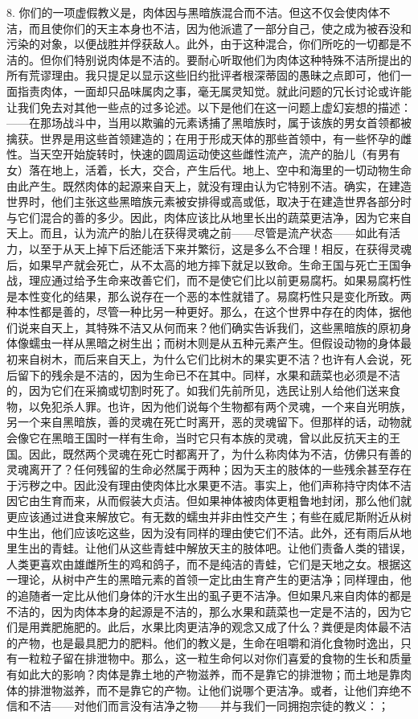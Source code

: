 8. 你们的一项虚假教义是，肉体因与黑暗族混合而不洁。但这不仅会使肉体不洁，而且使你们的天主本身也不洁，因为他派遣了一部分自己，使之成为被吞没和污染的对象，以便战胜并俘获敌人。此外，由于这种混合，你们所吃的一切都是不洁的。但你们特别说肉体是不洁的。要耐心听取他们为肉体这种特殊不洁所提出的所有荒谬理由。我只提足以显示这些旧约批评者根深蒂固的愚昧之点即可，他们一面指责肉体，一面却只品味属肉之事，毫无属灵知觉。就此问题的冗长讨论或许能让我们免去对其他一些点的过多论述。以下是他们在这一问题上虚幻妄想的描述：——在那场战斗中，当用以欺骗的元素诱捕了黑暗族时，属于该族的男女首领都被擒获。世界是用这些首领建造的；在用于形成天体的那些首领中，有一些怀孕的雌性。当天空开始旋转时，快速的圆周运动使这些雌性流产，流产的胎儿（有男有女）落在地上，活着，长大，交合，产生后代。地上、空中和海里的一切动物生命由此产生。既然肉体的起源来自天上，就没有理由认为它特别不洁。确实，在建造世界时，他们主张这些黑暗族元素被安排得或高或低，取决于在建造世界各部分时与它们混合的善的多少。因此，肉体应该比从地里长出的蔬菜更洁净，因为它来自天上。而且，认为流产的胎儿在获得灵魂之前——尽管是流产状态——如此有活力，以至于从天上掉下后还能活下来并繁衍，这是多么不合理！相反，在获得灵魂后，如果早产就会死亡，从不太高的地方摔下就足以致命。生命王国与死亡王国争战，理应通过给予生命来改善它们，而不是使它们比以前更易腐朽。如果易腐朽性是本性变化的结果，那么说存在一个恶的本性就错了。易腐朽性只是变化所致。两种本性都是善的，尽管一种比另一种更好。那么，在这个世界中存在的肉体，据他们说来自天上，其特殊不洁又从何而来？他们确实告诉我们，这些黑暗族的原初身体像蠕虫一样从黑暗之树生出；而树木则是从五种元素产生。但假设动物的身体最初来自树木，而后来自天上，为什么它们比树木的果实更不洁？也许有人会说，死后留下的残余是不洁的，因为生命已不在其中。同样，水果和蔬菜也必须是不洁的，因为它们在采摘或切割时死了。如我们先前所见，选民让别人给他们送来食物，以免犯杀人罪。也许，因为他们说每个生物都有两个灵魂，一个来自光明族，另一个来自黑暗族，善的灵魂在死亡时离开，恶的灵魂留下。但那样的话，动物就会像它在黑暗王国时一样有生命，当时它只有本族的灵魂，曾以此反抗天主的王国。因此，既然两个灵魂在死亡时都离开了，为什么称肉体为不洁，仿佛只有善的灵魂离开了？任何残留的生命必然属于两种；因为天主的肢体的一些残余甚至存在于污秽之中。因此没有理由使肉体比水果更不洁。事实上，他们声称持守肉体不洁因它由生育而来，从而假装大贞洁。但如果神体被肉体更粗鲁地封闭，那么他们就更应该通过进食来解放它。有无数的蠕虫并非由性交产生；有些在威尼斯附近从树中生出，他们应该吃这些，因为没有同样的理由使它们不洁。此外，还有雨后从地里生出的青蛙。让他们从这些青蛙中解放天主的肢体吧。让他们责备人类的错误，人类更喜欢由雄雌所生的鸡和鸽子，而不是纯洁的青蛙，它们是天地之女。根据这一理论，从树中产生的黑暗元素的首领一定比由生育产生的更洁净；同样理由，他的追随者一定比从他们身体的汗水生出的虱子更不洁净。但如果凡来自肉体的都是不洁的，因为肉体本身的起源是不洁的，那么水果和蔬菜也一定是不洁的，因为它们是用粪肥施肥的。此后，水果比肉更洁净的观念又成了什么？粪便是肉体最不洁的产物，也是最具肥力的肥料。他们的教义是，生命在咀嚼和消化食物时逸出，只有一粒粒子留在排泄物中。那么，这一粒生命何以对你们喜爱的食物的生长和质量有如此大的影响？肉体是靠土地的产物滋养，而不是靠它的排泄物；而土地是靠肉体的排泄物滋养，而不是靠它的产物。让他们说哪个更洁净。或者，让他们弃绝不信和不洁——对他们而言没有洁净之物——并与我们一同拥抱宗徒的教义：；\Bib